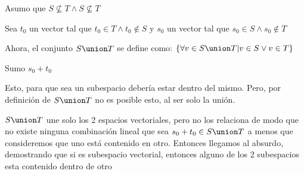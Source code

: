 \begin{enumerate}
        Asumo que $ S \nsubseteq T \land S \nsubseteq T $

        Sea $t_{0}$ un vector tal que $t_{0} \in T \land t_{0} \notin S$
        y $s_{0}$ un vector tal que $s_{0} \in S \land s_{0} \notin T$

        Ahora, el conjunto $ S \union T $ se define como: $ \{ \forall v \in S \union T | v \in S \lor v \in T \} $ 

        Sumo $s_{0} + t_{0}$

        Esto, para que sea un subespacio debería estar dentro del mismo. Pero, por definición de $ S \union T $
        no es posible esto, al ser solo la unión.

        $ S \union T $ une solo los 2 espacios vectoriales, pero no los relaciona de modo que
        no existe ninguna combinación lineal que sea $ s_{0} + t_{0} \in S \union T$ a menos que consideremos que uno está
        contenido en otro. Entonces llegamos al absurdo, demostrando que si es subespacio vectorial, entonces alguno de los
        2 subespacios esta contenido dentro de otro
\end{enumerate}

\begin{aportes}
  \item {}
  \item {}
  \item {}
\end{aportes}
